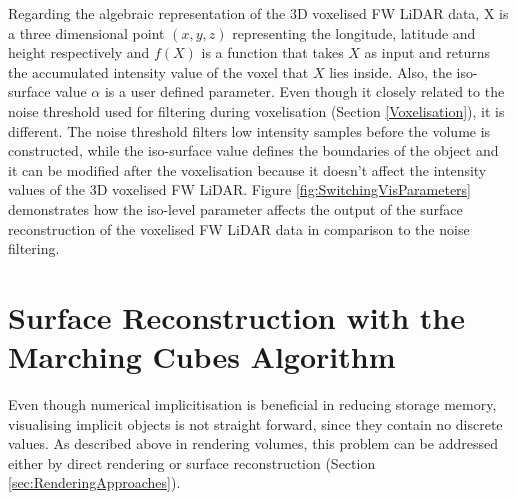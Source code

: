 \documentclass{subfiles}
\begin{document}
\par Regarding the algebraic representation of the 3D voxelised FW LiDAR data, X is a three dimensional point $\mathit{(x, y, z) }$ representing the longitude, latitude and height respectively and ${f(X)}$ is a function that takes  $\mathit{X}$ as input and returns the accumulated intensity value of the voxel that  $\mathit{X}$ lies inside. {\color{Fuchsia} Also, the iso-surface value $\mathit{\alpha }$ is a user defined parameter. Even though it closely related to the noise threshold used for filtering during voxelisation (Section \ref{Voxelisation}), it is different. The noise threshold filters low intensity samples before the volume is constructed, while the iso-surface value defines the boundaries of the object and it can be modified after the voxelisation because it doesn't affect the intensity values of the 3D voxelised FW LiDAR. Figure \ref{fig:SwitchingVisParameters} demonstrates how the iso-level parameter affects the output of the surface reconstruction of the voxelised FW LiDAR data in comparison to the noise filtering}.


\section {Surface Reconstruction with the Marching Cubes Algorithm}\label{sec:SurfaceReconstruction}

\par Even though numerical implicitisation is beneficial in reducing storage memory, visualising implicit objects is not straight forward, since they contain no discrete values. As described above in rendering volumes, this problem can be addressed either by direct rendering or surface reconstruction (Section \ref{sec:RenderingApproaches}). 
\end{document}
